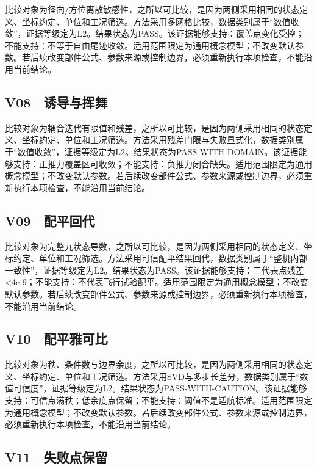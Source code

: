 \documentclass[UTF8,12pt,openany]{ctexbook}
\begin{document}
比较对象为径向/方位离散敏感性，之所以可比较，是因为两侧采用相同的状态定义、坐标约定、单位和工况筛选。方法采用多网格比较，数据类别属于“数值收敛”，证据等级定为L2。结果状态为PASS。该证据能够支持：覆盖点变化受控；不能支持：不等于自由尾迹收敛。适用范围限定为通用概念模型；不改变默认参数。若后续改变部件公式、参数来源或控制边界，必须重新执行本项检查，不能沿用当前结论。

\subsection{V08　诱导与挥舞}

比较对象为耦合迭代有限值和残差，之所以可比较，是因为两侧采用相同的状态定义、坐标约定、单位和工况筛选。方法采用残差门限与失败显式化，数据类别属于“数值收敛”，证据等级定为L2。结果状态为PASS-WITH-DOMAIN。该证据能够支持：正推力覆盖区可收敛；不能支持：负推力闭合缺失。适用范围限定为通用概念模型；不改变默认参数。若后续改变部件公式、参数来源或控制边界，必须重新执行本项检查，不能沿用当前结论。

\subsection{V09　配平回代}

比较对象为完整九状态导数，之所以可比较，是因为两侧采用相同的状态定义、坐标约定、单位和工况筛选。方法采用可信配平结果回代，数据类别属于“整机内部一致性”，证据等级定为L2。结果状态为PASS。该证据能够支持：三代表点残差<4e-9；不能支持：不代表飞行试验配平。适用范围限定为通用概念模型；不改变默认参数。若后续改变部件公式、参数来源或控制边界，必须重新执行本项检查，不能沿用当前结论。

\subsection{V10　配平雅可比}

比较对象为秩、条件数与边界余度，之所以可比较，是因为两侧采用相同的状态定义、坐标约定、单位和工况筛选。方法采用SVD与多步长差分，数据类别属于“数值可信度”，证据等级定为L2。结果状态为PASS-WITH-CAUTION。该证据能够支持：可信点满秩；低余度点保留；不能支持：阈值不是适航标准。适用范围限定为通用概念模型；不改变默认参数。若后续改变部件公式、参数来源或控制边界，必须重新执行本项检查，不能沿用当前结论。

\subsection{V11　失败点保留}
\end{document}
